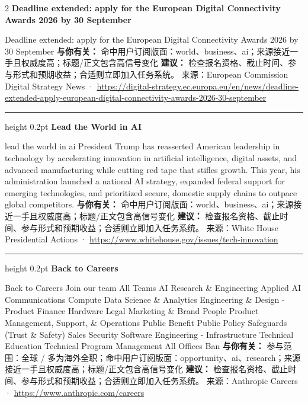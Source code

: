 \documentclass[10.5pt]{ctexart}
\begin{document}
\begin{multicols}{2}
{\large\bfseries Deadline extended: apply for the European Digital Connectivity Awards 2026 by 30 September}\par
Deadline extended: apply for the European Digital Connectivity Awards 2026 by 30 September
\textbf{与你有关：} 命中用户订阅版面：world、business、ai；来源接近一手且权威度高；标题/正文包含高信号变化
\textbf{建议：} 检查报名资格、截止时间、参与形式和预期收益；合适则立即加入任务系统。
{\footnotesize\color{ormuted} 来源：European Commission Digital Strategy News · \url{https://digital-strategy.ec.europa.eu/en/news/deadline-extended-apply-european-digital-connectivity-awards-2026-30-september}}
\vspace{2mm}
\hrule height 0.2pt
\vspace{2mm}
{\large\bfseries Lead the World in AI}\par
lead the world in ai President Trump has reasserted American leadership in technology by accelerating innovation in artificial intelligence, digital assets, and advanced manufacturing while cutting red tape that stifles growth. This year, his administration launched a national AI strategy, expanded federal support for emerging technologies, and prioritized secure, domestic supply chains to outpace global competitors.
\textbf{与你有关：} 命中用户订阅版面：world、business、ai；来源接近一手且权威度高；标题/正文包含高信号变化
\textbf{建议：} 检查报名资格、截止时间、参与形式和预期收益；合适则立即加入任务系统。
{\footnotesize\color{ormuted} 来源：White House Presidential Actions · \url{https://www.whitehouse.gov/issues/tech-innovation}}
\vspace{2mm}
\hrule height 0.2pt
\vspace{2mm}
{\large\bfseries Back to Careers}\par
Back to Careers Join our team All Teams AI Research \& Engineering Applied AI Communications Compute Data Science \& Analytics Engineering \& Design - Product Finance Hardware Legal Marketing \& Brand People Product Management, Support, \& Operations Public Benefit Public Policy Safeguards (Trust \& Safety) Sales Security Software Engineering - Infrastructure Technical Education Technical Program Management All Offices Ban
\textbf{与你有关：} 参与范围：全球 / 多为海外全职；命中用户订阅版面：opportunity、ai、research；来源接近一手且权威度高；标题/正文包含高信号变化
\textbf{建议：} 检查报名资格、截止时间、参与形式和预期收益；合适则立即加入任务系统。
{\footnotesize\color{ormuted} 来源：Anthropic Careers · \url{https://www.anthropic.com/careers}}

\end{multicols}
\end{document}
